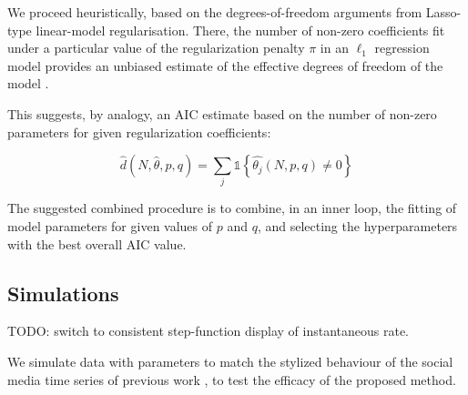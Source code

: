 \documentclass[11pt]{article}
\begin{document}
We proceed heuristically, based on the degrees-of-freedom arguments from
Lasso-type linear-model regularisation. There, the number of non-zero
coefficients fit under a particular value of the regularization penalty
\(\pi\) in an \(\ell_1\) regression model provides an unbiased estimate
of the effective degrees of freedom of the model
\cite{zou_degrees_2007}.

    This suggests, by analogy, an AIC estimate based on the number of
non-zero parameters for given regularization coefficients:

\[
\hat{d}\left(N,\hat{\theta},p,q\right)=\sum_j\mathbb 1\left\{\hat{\theta_j}(N,p,q)\neq 0\right\}
\]

    The suggested combined procedure is to combine, in an inner loop, the
fitting of model parameters for given values of \(p\) and \(q\), and
selecting the hyperparameters with the best overall AIC value.

    \subsection{Simulations}\label{simulations}

    TODO: switch to consistent step-function display of instantaneous rate.

    We simulate data with parameters to match the stylized behaviour of the
social media time series of previous work
\cite{crane_robust_2008,mitchell_hawkes_2010,rizoiu_expecting_2017}, to
test the efficacy of the proposed method.


    \begin{center}
    \end{center}
    { \hspace*{\fill} \\}
    
    \begin{center}
    \end{center}
    { \hspace*{\fill} \\}
    
    \begin{center}
    \end{center}
    { \hspace*{\fill} \\}
    
\end{document}

